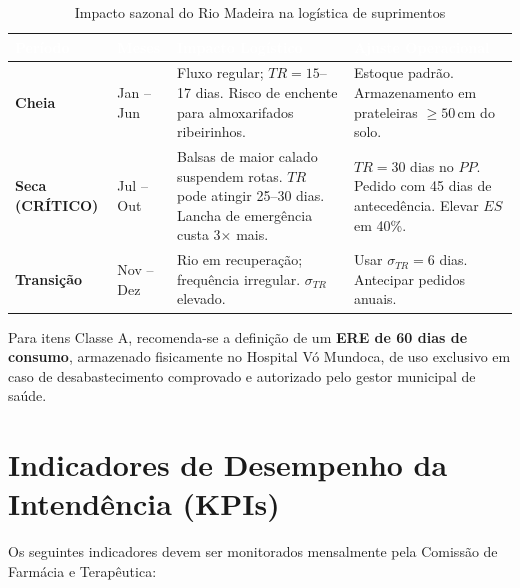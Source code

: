 \documentclass[12pt,a4paper]{article}
\begin{document}
\begin{table}[H]
\centering
\caption{Impacto sazonal do Rio Madeira na logística de suprimentos}
\label{tab:sazonalidade}
\small
{}
\begin{tabular}{>{\bfseries}p{2.4cm} >{\centering\arraybackslash}p{2cm} p{4.8cm} p{4.4cm}}
  \rowcolor{navyblue}
  \textcolor{white}{\textbf{Período}} &
  \textcolor{white}{\textbf{Meses}} &
  \textcolor{white}{\textbf{Impacto Logístico}} &
  \textcolor{white}{\textbf{Ajuste Operacional}} \\
  \toprule
  Cheia         & Jan -- Jun & Fluxo regular; $TR = 15$--17 dias. Risco de enchente para almoxarifados ribeirinhos. & Estoque padrão. Armazenamento em prateleiras $\geq 50\,\text{cm}$ do solo. \\
  Seca (CRÍTICO)& Jul -- Out & Balsas de maior calado suspendem rotas. $TR$ pode atingir 25--30 dias. Lancha de emergência custa 3$\times$ mais. & $TR = 30$ dias no $PP$. Pedido com 45 dias de antecedência. Elevar $ES$ em 40\%. \\
  Transição     & Nov -- Dez & Rio em recuperação; frequência irregular. $\sigma_{TR}$ elevado. & Usar $\sigma_{TR} = 6$ dias. Antecipar pedidos anuais. \\
  \bottomrule
\end{tabular}
\end{table}

\begin{recbox}
Para itens Classe A, recomenda-se a definição de um \textbf{ERE de 60 dias de consumo}, armazenado fisicamente no Hospital Vó Mundoca, de uso exclusivo em caso de desabastecimento comprovado e autorizado pelo gestor municipal de saúde.
\end{recbox}

\section{Indicadores de Desempenho da Intendência (KPIs)}

Os seguintes indicadores devem ser monitorados mensalmente pela Comissão de Farmácia e Terapêutica:
\end{document}
